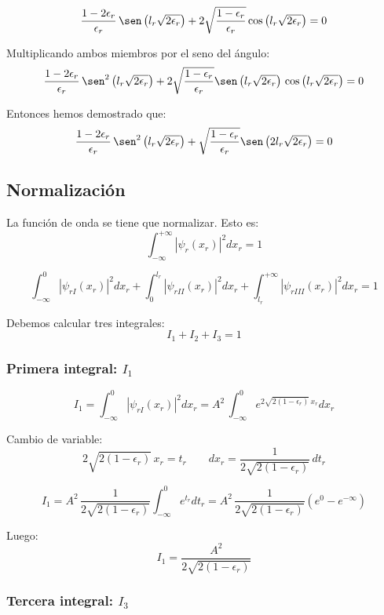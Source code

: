 \[
\frac{1-2\epsilon_r}{\epsilon_r}\,
\sen\left(l_r\sqrt{2\epsilon_r}\right)
+
2\sqrt{\frac{1-\epsilon_r}{\epsilon_r}}
\cos\left(l_r\sqrt{2\epsilon_r}\right)
=0
\]

Multiplicando ambos miembros por el seno del ángulo:
\[
\frac{1-2\epsilon_r}{\epsilon_r}\,
\sen^2\left(l_r\sqrt{2\epsilon_r}\right)
+
2\sqrt{\frac{1-\epsilon_r}{\epsilon_r}}
\sen\left(l_r\sqrt{2\epsilon_r}\right)\,
\cos\left(l_r\sqrt{2\epsilon_r}\right)
=0
\]

Entonces hemos demostrado que:
\[
\frac{1-2\epsilon_r}{\epsilon_r}\,
\sen^2\left(l_r\sqrt{2\epsilon_r}\right)
+
\sqrt{\frac{1-\epsilon_r}{\epsilon_r}}
\sen\left(2l_r\sqrt{2\epsilon_r}\right)
=0
\]

\subsection{Normalización}
La función de onda se tiene que normalizar. Esto es:
\[
\int_{-\infty}^{+\infty} \left|\psi_r(x_r)\right|^2 dx_r = 1
\]

\[
\int_{-\infty}^{0}\left|\psi_{rI}(x_r)\right|^2 dx_r 
 + \int_{0}^{l_r}\left|\psi_{rII}(x_r)\right|^2 dx_r 
 + \int_{l_r}^{+\infty}\left|\psi_{rIII}(x_r)\right|^2 dx_r 
 = 1
\]

Debemos calcular tres integrales:
\begin{equation}
\label{normalization_eq}
I_1 + I_2 + I_3 = 1
\end{equation}

\subsubsection{Primera integral: $I_1$}

\[
I_1 = \int_{-\infty}^{0}\left|\psi_{rI}(x_r)\right|^2 dx_r 
= 
A^2\,\int_{-\infty}^0 e^{2\sqrt{2(1-\epsilon_r)}\,x_r} dx_r
\]

Cambio de variable:
\[
2\sqrt{2(1-\epsilon_r)}\,x_r = t_r
\hspace{2em}
dx_r = \frac{1}{2\sqrt{2(1-\epsilon_r)}}\,dt_r
\]

\[
I_1
= A^2\,\frac{1}{2\sqrt{2(1-\epsilon_r)}}\int_{-\infty}^0 e^{t_r} dt_r
= A^2\,\frac{1}{2\sqrt{2(1-\epsilon_r)}}(e^0-e^{-\infty})
\]

Luego:
\begin{equation}
\label{I1}
I_1 = \frac{A^2}{2\sqrt{2(1-\epsilon_r)}}
\end{equation}

\subsubsection{Tercera integral: $I_3$}

